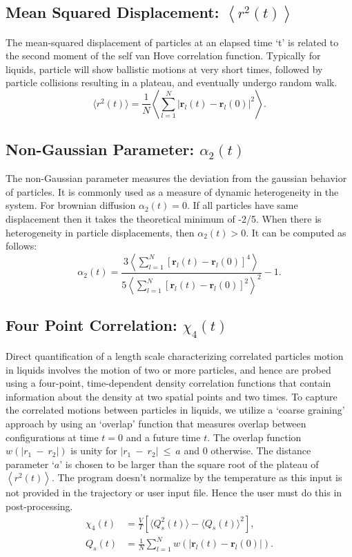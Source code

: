 \documentclass{article}
\begin{document}
\subsection{Mean Squared Displacement: $\left<r^2(t)\right>$} \label{sec::MSD}
The mean-squared displacement of particles at an elapsed time `t' is related to the second moment of the self van Hove correlation function. Typically for liquids, particle will show ballistic motions at very short times, followed by particle collisions resulting in a plateau, and eventually undergo random walk.
\begin{equation}
\langle r^2(t)\rangle = \frac{1}{N}\left\langle\sum\limits_{l=1}^N |\mathbf{r}_l(t) - \mathbf{r}_l(0)|^2\right\rangle.
\end{equation}

\subsection{Non-Gaussian Parameter: $\alpha_2(t)$} \label{sec::alpha2}
The non-Gaussian parameter measures the deviation from the gaussian behavior of particles. It is commonly used as a measure of dynamic heterogeneity in the system. For brownian diffusion $\alpha_2(t) = 0$. If all particles have same displacement then it takes the theoretical minimum of -2/5. When there is heterogeneity in particle displacements, then $\alpha_2(t) > 0$. It can be computed as follows:
\begin{equation}
\alpha_2(t) = \frac{3\left\langle\sum\limits_{l=1}^N[\mathbf{r}_l(t) - \mathbf{r}_l(0)]^4\right\rangle}{5\left\langle\sum\limits_{l=1}^N[\mathbf{r}_l(t) - \mathbf{r}_l(0)]^2\right\rangle^2} - 1.
\end{equation}
 
 \subsection{Four Point Correlation: $\chi_4(t)$} \label{sec::chi4}
Direct quantification of a length scale characterizing correlated particles motion in liquids involves the motion of two or more particles, and hence are probed using a four-point, time-dependent density correlation functions that contain information about the density at two spatial points and two times. To capture the correlated motions between particles in liquids, we utilize a `coarse graining' approach by using an `overlap' function that measures overlap between configurations at time $t=0$ and a future time $t$.  The overlap function $w(|r_1~-~r_2|)$ is unity for $|r_1~-~r_2|~\leq~a$ and 0 otherwise. The distance parameter `$a$' is chosen to be larger than the square root of the plateau of $\left<r^2(t)\right>$. The program doesn't normalize by the temperature as this input is not provided in the trajectory or user input file. Hence the user must do this in post-processing.
\begin{equation}
\begin{split}
\chi_4(t) &= \frac{V}{T}[\langle Q_s^2(t)\rangle - \langle Q_s(t)\rangle^2],\\
Q_s(t) &= \frac{1}{N} \sum_{l=1}^N \textit{w}(|\mathbf{r}_l(t) - \mathbf{r}_l(0)|).
\end{split}
\end{equation}
\end{document}
